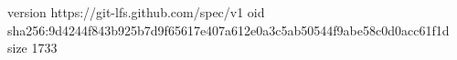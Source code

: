 version https://git-lfs.github.com/spec/v1
oid sha256:9d4244f843b925b7d9f65617e407a612e0a3c5ab50544f9abe58c0d0acc61f1d
size 1733
